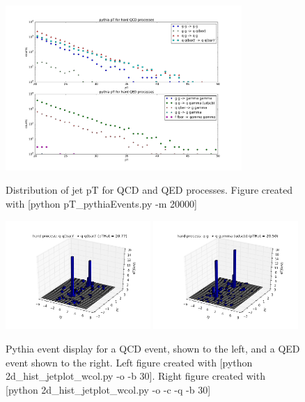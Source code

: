 \documentclass[11pt]{article}
\begin{document}
\begin{figure}[h]
\begin{center}
\includegraphics[width=0.8\textwidth]{pT_pythiaEvents.pdf}
\label{fig_label}
\caption{Distribution of jet pT for QCD and QED processes.  Figure created with [python pT\_pythiaEvents.py -m 20000]}
\end{center}
\end{figure}

\begin{figure}[h]
\begin{center}
\includegraphics[width=0.49\textwidth]{2d_hist_jetplot.png}
\includegraphics[width=0.49\textwidth]{2d_hist_jetplot2.png}
\label{fig_label}
\caption{Pythia event display for a QCD event, shown to the left, and a QED event shown to the right.  Left figure created with [python 2d\_hist\_jetplot\_wcol.py -o -b 30]. Right figure created with [python 2d\_hist\_jetplot\_wcol.py -o -c -q -b 30]}
\end{center}
\end{figure}
\end{document}
